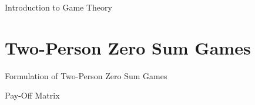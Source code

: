 

Introduction to Game Theory






\section{Two-Person Zero Sum Games}

Formulation of Two-Person Zero Sum Games

Pay-Off Matrix









